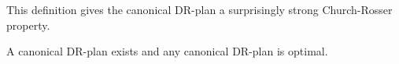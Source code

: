 This definition gives the canonical DR-plan a surprisingly strong Church-Rosser property.

\begin{theorem}
\label{theorem:canonical_exists_and_is_optimal}
\label{theorem:canonical_is_optimal}
\label{theorem:main}
    A canonical DR-plan exists and any canonical DR-plan is optimal.
\end{theorem}






